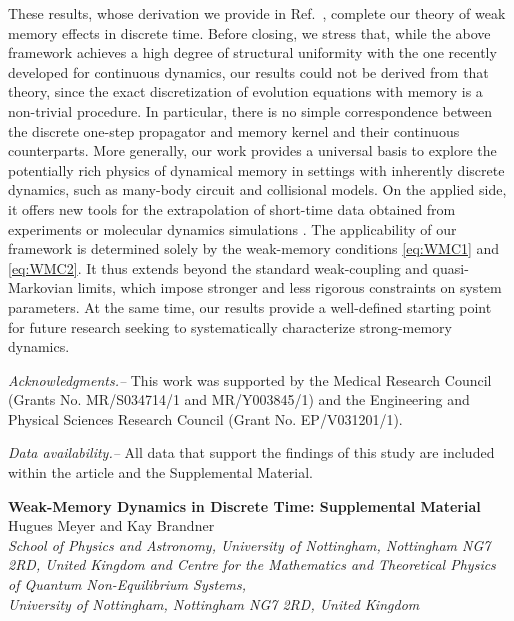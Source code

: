 \documentclass[aps,prl,reprint]{revtex4-2}
\begin{document}
These results, whose derivation we provide in Ref.~\cite{meyerWeakMemoryDynamicsDiscrete2025}, complete our theory of weak memory effects in discrete time.
Before closing, we stress that, while the above framework achieves a high degree of structural uniformity with the one recently developed for continuous dynamics, our results could not be derived from that theory, since the exact discretization of evolution equations with memory is a non-trivial procedure. In particular, there is no simple correspondence between the discrete one-step propagator and memory kernel and their continuous counterparts.
More generally, our work provides a universal basis to explore the potentially rich physics of dynamical memory in settings with inherently discrete dynamics, such as many-body circuit and collisional models.
On the applied side, it offers new tools for the extrapolation of short-time data obtained from experiments or molecular dynamics simulations \cite{jungIterativeReconstructionMemory2017,
klippensteinIntroducingMemoryCoarseGrained2021a,
vroylandtLikelihoodbasedNonMarkovianModels2022,
tepperAccurateMemoryKernel2024,
daltonMemoryFrictionNanoscale2025,
satoreMarkovTypeStateModels2025}.
The applicability of our framework is determined solely by the weak-memory conditions \eqref{eq:WMC1} and \eqref{eq:WMC2}.
It thus extends beyond the standard weak-coupling and quasi-Markovian limits, which impose stronger and less rigorous constraints on system parameters.
At the same time, our results provide a well-defined starting point for future research seeking to systematically characterize strong-memory dynamics.

\emph{Acknowledgments.--}
This work was supported by the Medical Research Council (Grants No. MR/S034714/1 and MR/Y003845/1) and the Engineering and Physical Sciences Research Council (Grant No. EP/V031201/1).

\emph{Data availability.--} All data that support the findings of this study are included within the article and the Supplemental Material.

\let\oldaddcontentsline\addcontentsline
\renewcommand{\addcontentsline}[3]{}


\let\addcontentsline\oldaddcontentsline

\clearpage

\onecolumngrid

\begin{center}
	{\large \bf Weak-Memory Dynamics in Discrete Time: Supplemental Material} \\
	\vspace{2ex} {\normalsize Hugues Meyer and Kay Brandner}\\
	\vspace{2ex} {\it School of Physics and Astronomy, University of Nottingham,
		Nottingham NG7 2RD, United Kingdom and Centre for the Mathematics and Theoretical
		Physics of Quantum Non-Equilibrium Systems,\\ University of Nottingham, Nottingham NG7 2RD,
		United Kingdom}\\
	\vspace{2ex}
\end{center}
\end{document}
